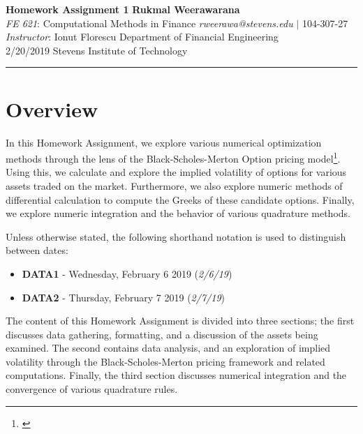 \documentclass[10pt]{article}
\begin{document}
\thispagestyle{plain}


\noindent
\large\textbf{Homework Assignment 1} \hfill \textbf{Rukmal Weerawarana} \\
\normalsize \textit{FE 621}: Computational Methods in Finance \hfill \textit{rweerawa@stevens.edu} $\mid$ 104-307-27 \\
\textit{Instructor}: Ionut Florescu \hfill Department of Financial Engineering \\
2/20/2019 \hfill Stevens Institute of Technology

\noindent\rule{\linewidth}{.1em}



\section*{Overview}

In this Homework Assignment, we explore various numerical optimization methods through the lens of the Black-Scholes-Merton Option pricing model\footnote{\cite{Shreve2004}}. Using this, we calculate and explore the implied volatility of options for various assets traded on the market. Furthermore, we also explore numeric methods of differential calculation to compute the Greeks of these candidate options. Finally, we explore numeric integration and the behavior of various quadrature methods.

Unless otherwise stated, the following shorthand notation is used to distinguish between dates:

\begin{itemize}
    \item \textbf{DATA1} - Wednesday, February 6 2019 (\textit{2/6/19})
    \item \textbf{DATA2} - Thursday, February 7 2019 (\textit{2/7/19})
\end{itemize}

The content of this Homework Assignment is divided into three sections; the first discusses data gathering, formatting, and a discussion of the assets being examined. The second contains data analysis, and an exploration of implied volatility through the Black-Scholes-Merton pricing framework and related computations. Finally, the third section discusses numerical integration and the convergence of various quadrature rules.
\end{document}
